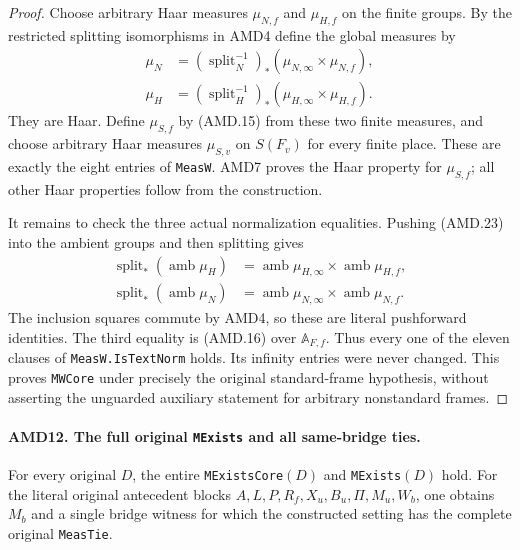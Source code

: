 \documentclass[11pt,a4paper]{article}
\numberwithin{equation}{section}
\theoremstyle{remark}\newtheorem{remark}[theorem]{Remark}
\begin{document}
\begin{proof}
Choose arbitrary Haar measures \(\mu_{N,f}\) and \(\mu_{H,f}\)
on the finite groups.  By the restricted splitting isomorphisms
in AMD4 define the global measures by
\[
\begin{split}
 \mu_N&=(\operatorname{split}_N^{-1})_*
                  (\mu_{N,\infty}\times\mu_{N,f}),\\
 \mu_H&=(\operatorname{split}_H^{-1})_*
                  (\mu_{H,\infty}\times\mu_{H,f}).
\end{split}
 \tag{AMD.23}
\]
They are Haar.  Define \(\mu_{S,f}\) by (AMD.15) from these
two finite measures, and choose arbitrary Haar measures
\(\mu_{S,v}\) on \(S(F_v)\) for every finite place.
These are exactly the eight entries of \texttt{Meas\allowbreak W}.
AMD7 proves the Haar property for \(\mu_{S,f}\); all other
Haar properties follow from the construction.

It remains to check the three actual normalization equalities.
Pushing (AMD.23) into the ambient groups and then splitting gives
\[
\begin{split}
 \operatorname{split}_*(\operatorname{amb}\mu_H)
   &=\operatorname{amb}\mu_{H,\infty}
                       \times\operatorname{amb}\mu_{H,f},\\
 \operatorname{split}_*(\operatorname{amb}\mu_N)
   &=\operatorname{amb}\mu_{N,\infty}
                       \times\operatorname{amb}\mu_{N,f}.
\end{split}
 \tag{AMD.24}
\]
The inclusion squares commute by AMD4, so these are literal
pushforward identities.  The third equality is (AMD.16) over
\(\mathbb A_{F,f}\).  Thus every one of the eleven clauses of
\texttt{Meas\allowbreak W.\allowbreak Is\allowbreak Text\allowbreak Norm} holds.  Its infinity entries were
never changed.  This proves \texttt{MWCore} under precisely
the original standard-frame hypothesis, without asserting the
unguarded auxiliary statement for arbitrary nonstandard frames.
\end{proof}

\paragraph{AMD12. The full original \texttt{MExists} and all same-bridge ties.}
\label{claim:AMD12}
For every original \(D\), the entire \texttt{MExists\allowbreak Core}\((D)\)
and \texttt{MExists}\((D)\) hold.  For the literal original
antecedent blocks \(A,L,P,R_f,X_u,B_u,\Pi,M_u,W_b\), one
obtains \(M_b\) and a single bridge witness for which the
constructed setting has the complete original \texttt{Meas\allowbreak Tie}.
\end{document}
